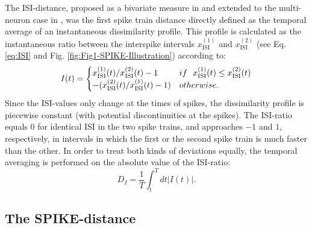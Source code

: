 \documentclass[10pt,twocolumn]{elsart5p}
\begin{document}
The ISI-distance, proposed as a bivariate measure in \citep{Kreuz07c} and extended to the multi-neuron case in \citep{Kreuz09}, was the first spike train distance directly defined as the temporal average of an instantaneous dissimilarity profile. This profile is calculated as the instantaneous ratio between the interspike intervals $x_{\mathrm {ISI}}^{(1)}$ and $x_{\mathrm {ISI}}^{(2)}$ (see Eq. \ref{eq:ISI} and Fig. \ref{fig:Fig1-SPIKE-Illustration}) according to:
%
\begin{equation} \label{eq:ISI-Ratio}
    I (t) = \begin{cases}
           x_{\mathrm {ISI}}^{(1)} (t) / x_{\mathrm {ISI}}^{(2)} (t) - 1 & {\rm if} ~~ x_{\mathrm {ISI}}^{(1)} (t) \leq x_{\mathrm {ISI}}^{(2)} (t) \cr
                      - (x_{\mathrm {ISI}}^{(2)} (t) / x_{\mathrm {ISI}}^{(1)} (t) -1)     & {\rm otherwise}.
                  \end{cases}
\end{equation}
%
Since the ISI-values only change at the times of spikes, the dissimilarity profile is piecewise constant (with potential discontinuities at the spikes). The ISI-ratio equals $0$ for identical ISI in the two spike trains, and approaches $-1$ and $1$, respectively, in intervals in which the first or the second spike train is much faster than the other. In order to treat both kinds of deviations equally, the temporal averaging is performed on the absolute value of the ISI-ratio:
%
\begin{equation} \label{eq:Temporal-Average}
    D_I = \frac{1}{T} \int_{t}^T dt |I (t)|.
\end{equation}


\subsection{\label{ss:SPIKE-Distance} The SPIKE-distance}
\end{document}
